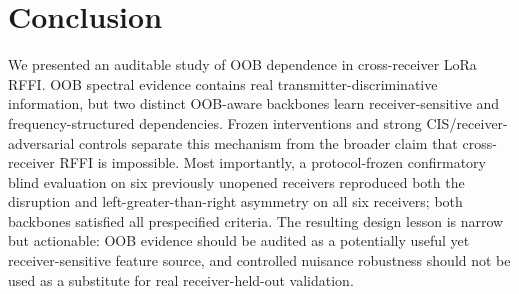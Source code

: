 \section{Conclusion}
\label{sec:conclusion}
We presented an auditable study of OOB dependence in cross-receiver LoRa RFFI. OOB spectral evidence contains real transmitter-discriminative information, but two distinct OOB-aware backbones learn receiver-sensitive and frequency-structured dependencies. Frozen interventions and strong CIS/receiver-adversarial controls separate this mechanism from the broader claim that cross-receiver RFFI is impossible. Most importantly, a protocol-frozen confirmatory blind evaluation on six previously unopened receivers reproduced both the disruption and left-greater-than-right asymmetry on all six receivers; both backbones satisfied all prespecified criteria. The resulting design lesson is narrow but actionable: OOB evidence should be audited as a potentially useful yet receiver-sensitive feature source, and controlled nuisance robustness should not be used as a substitute for real receiver-held-out validation.
